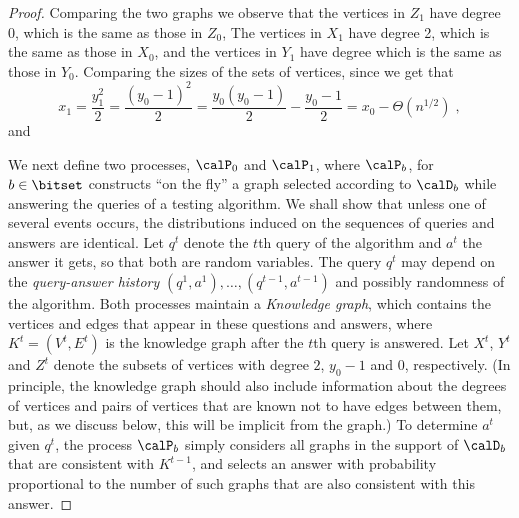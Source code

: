 \begin{proof}
Comparing the two graphs we observe that the vertices in
$Z_1$ have degree 0, which is the same as those in $Z_0$, The vertices in $X_1$ have degree 2, which is the same as those in $X_0$, and  the vertices in $Y_1$ have degree 
which is the same as those in $Y_0$.
Comparing the sizes of the sets of vertices, since 
we get that
$$x_1 = \frac{y_1^2}{2} = \frac{(y_0-1)^2}{2} = \frac{y_0(y_0-1)}{2} - \frac{y_0-1}{2} = x_0 - \Theta(n^{1/2})\;,$$
and

We next define two processes, $\calP_0$ and $\calP_1$, where $\calP_b$, for $b\in \bitset$ constructs ``on the fly'' a graph selected  according to $\calD_b$ while answering the queries of a testing algorithm. We shall show that unless one of several events occurs, the distributions induced on the sequences of queries and answers are identical. Let $q^t$ denote the $t$th query of the algorithm and $a^t$ the answer it gets, so that both are random variables. The query $q^t$ may depend on the \emph{query-answer history} $(q^1,a^1),\dots,(q^{t-1},a^{t-1})$ and possibly randomness of the algorithm. Both processes maintain a \emph{Knowledge graph}, which contains the vertices and edges that appear in these questions and answers, where $K^t=(V^t,E^t)$ is the knowledge graph after the $t$th query is answered. Let $X^t$, $Y^t$ and $Z^t$ denote the subsets of vertices with degree $2$, $y_0-1$ and $0$, respectively.
(In principle, the knowledge graph should also include information about the degrees of vertices and pairs of vertices that are known not to have edges between them, but, as we discuss below, this will be implicit from the graph.)
To determine $a^t$ given $q^t$,
the process $\calP_b$ simply considers all graphs in the support of $\calD_b$ that are consistent with $K^{t-1}$, and selects an answer with probability proportional to the number of such graphs that are also consistent with this answer.


\end{proof}
